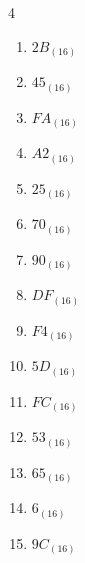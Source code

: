 \begin{multicols}{4}
\begin{enumerate}
        \phantom{$=136$}

  \item $2B_{(16)}$

        \phantom{$=43$}

  \item $45_{(16)}$

        \phantom{$=69$}

  \item $FA_{(16)}$

        \phantom{$=250$}

  \item $A2_{(16)}$

        \phantom{$=162$}

\columnbreak %

  \item $25_{(16)}$

        \phantom{$=37$}

  \item $70_{(16)}$

        \phantom{$=112$}

  \item $90_{(16)}$

        \phantom{$=144$}

  \item $DF_{(16)}$

        \phantom{$=223$}

  \item $F4_{(16)}$

        \phantom{$=244$}

  \item $5D_{(16)}$

        \phantom{$=93$}

  \item $FC_{(16)}$

        \phantom{$=252$}

  \item $53_{(16)}$

        \phantom{$=83$}

  \item $65_{(16)}$

        \phantom{$=101$}

  \item $6_{(16)}$

        \phantom{$=6$}

  \item $9C_{(16)}$

        \phantom{$=156$}


\end{enumerate}
\end{multicols}
